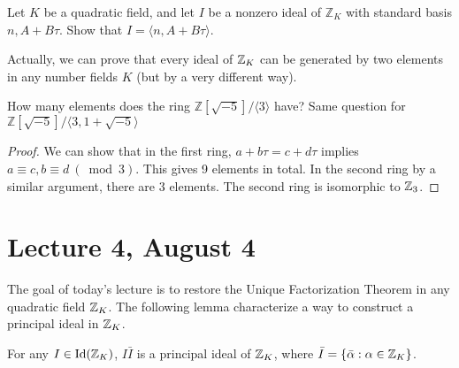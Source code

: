 \documentclass[12pt,twoside=semi,openright,numbers=noenddot]{scrbook}
\begin{document}
    \begin{corollary}
        Let $K$ be a quadratic field, and let $I$ be a nonzero ideal of $\mathbb{Z}_{K}$ with standard basis $n, A+B \tau$.
        Show that $I=\langle n, A+B \tau\rangle$.
    \end{corollary}
    Actually, we can prove that every ideal of $\mathbb Z_K$ can be generated by two elements in any number fields $K$ (but by a very different way).
\begin{problem}
    How many elements does the ring $\mathbb{Z}[\sqrt{-5}] /\langle 3\rangle$ have?
    Same question for $\mathbb{Z}[\sqrt{-5}] /\langle 3,1+\sqrt{-5}\rangle$
\end{problem}
    \begin{proof}
        We can show that in the first ring, $a+b\tau = c+d\tau$ implies $a \equiv c, b \equiv d \ (\bmod 3)$. This gives 
        9 elements in total. In the second ring by a similar argument, there are 3 elements. The second ring is isomorphic to $\mathbb Z_3$.
    \end{proof}

\section{Lecture 4, August 4}
The goal of today's lecture is to restore the Unique Factorization Theorem in any quadratic field $\mathbb Z_K$.
The following lemma characterize a way to construct a principal ideal in $\mathbb Z_K$.
\begin{lemma}
    For any $I \in \text{Id}(\mathbb Z_K)$, $I\bar{I}$ is a principal ideal of $\mathbb Z_K$, where $\bar{I} = \{\bar{\alpha}: \alpha \in \mathbb Z_K\}$.
\end{lemma}
\end{document}
